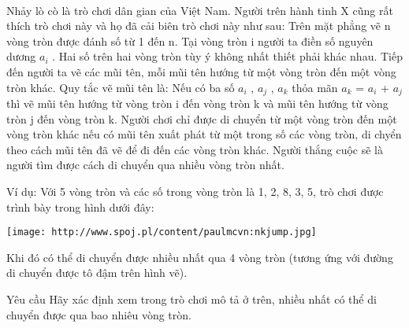  

Nhảy lò cò là trò chơi dân gian của Việt Nam. Người trên hành tinh X cũng rất thích trò chơi này và họ đã cải biên trò chơi này như sau: Trên mặt phẳng vẽ n vòng tròn được đánh số từ 1 đến n. Tại vòng tròn i người ta điền số nguyên dương $a_{i}$ . Hai số trên hai vòng tròn tùy ý không nhất thiết phải khác nhau. Tiếp đến người ta vẽ các mũi tên, mỗi mũi tên hướng từ một vòng tròn đến một vòng tròn khác. Quy tắc vẽ mũi tên là: Nếu có ba số $a_{i}$ , $a_{j}$ , $a_{k}$ thỏa mãn $a_{k}$ = $a_{i}$ + $a_{j}$ thì vẽ mũi tên hướng từ vòng tròn i đến vòng tròn k và mũi tên hướng từ vòng tròn j đến vòng tròn k. Người chơi chỉ được di chuyển từ một vòng tròn đến một vòng tròn khác nếu có mũi tên xuất phát từ một trong số các vòng tròn, di chyển theo cách mũi tên đã vẽ để đi đến các vòng tròn khác. Người thắng cuộc sẽ là người tìm được cách di chuyển qua nhiều vòng tròn nhất.

Ví dụ: Với 5 vòng tròn và các số trong vòng tròn là 1, 2, 8, 3, 5, trò chơi được trình bày trong hình dưới đây:


\texttt{[image: http://www.spoj.pl/content/paulmcvn:nkjump.jpg]}

Khi đó có thể di chuyển được nhiều nhất qua 4 vòng tròn (tương ứng với đường di chuyển được tô đậm trên hình vẽ).

Yêu cầu
Hãy xác định xem trong trò chơi mô tả ở trên, nhiều nhất có thể di chuyển được qua bao nhiêu vòng tròn.